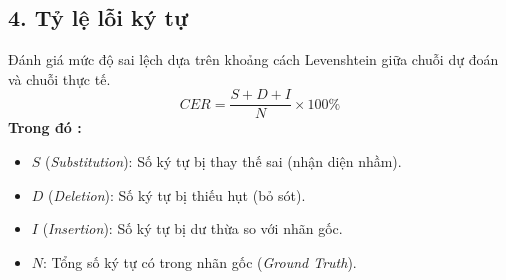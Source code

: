 \subsection*{4. Tỷ lệ lỗi ký tự}
Đánh giá mức độ sai lệch dựa trên khoảng cách Levenshtein giữa chuỗi dự đoán và chuỗi thực tế.
\begin{equation}
CER = \frac{S + D + I}{N} \times 100\%
\end{equation}
\textbf{Trong đó :}
\begin{itemize}
    \item $S$ (\textit{Substitution}): Số ký tự bị thay thế sai (nhận diện nhầm).
    \item $D$ (\textit{Deletion}): Số ký tự bị thiếu hụt (bỏ sót).
    \item $I$ (\textit{Insertion}): Số ký tự bị dư thừa so với nhãn gốc.
    \item $N$: Tổng số ký tự có trong nhãn gốc (\textit{Ground Truth}).
\end{itemize}